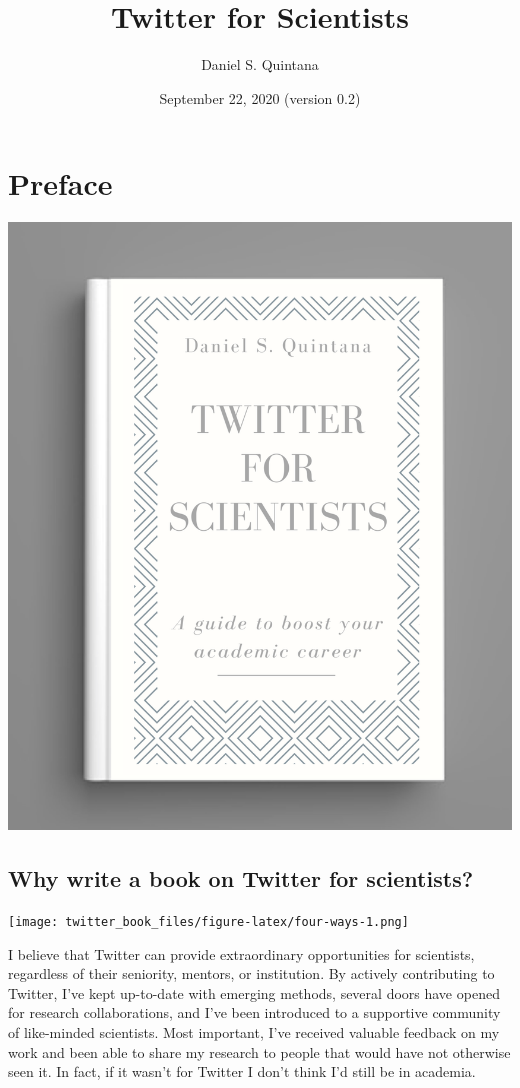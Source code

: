 \documentclass[
]{book}
\title{Twitter for Scientists}
\author{Daniel S. Quintana}
\date{September 22, 2020 (version 0.2)}
\begin{document}
\maketitle

{
\setcounter{tocdepth}{1}
\tableofcontents
}
\hypertarget{preface}{%
\chapter*{Preface}\label{preface}}

\begin{flushleft}\includegraphics[width=0.8\linewidth,height=0.5\textheight]{images/book_cover} \end{flushleft}

\hypertarget{why-write-a-book-on-twitter-for-scientists}{%
\section*{Why write a book on Twitter for scientists?}\label{why-write-a-book-on-twitter-for-scientists}}

\texttt{[image: twitter\_book\_files/figure-latex/four-ways-1.png]}

I believe that Twitter can provide extraordinary opportunities for scientists, regardless of their seniority, mentors, or institution. By actively contributing to Twitter, I've kept up-to-date with emerging methods, several doors have opened for research collaborations, and I've been introduced to a supportive community of like-minded scientists. Most important, I've received valuable feedback on my work and been able to share my research to people that would have not otherwise seen it. In fact, if it wasn't for Twitter I don't think I'd still be in academia.
\end{document}
